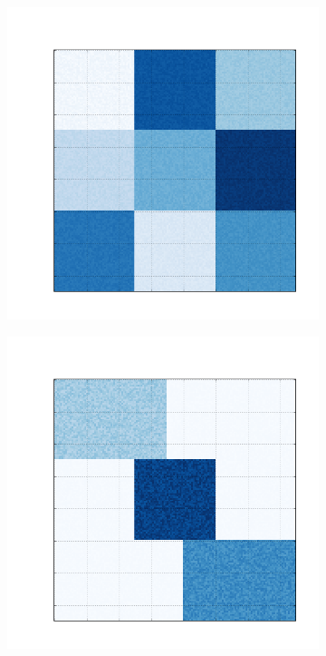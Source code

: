 \documentclass[
    12pt,                %
    oneside,            %
    a4paper,            %
    english,            %
    brazil                %
    ]{abntex2ppgsi}
\begin{document}
\begin{figure}[H]
\begin{subfigure}[b]{0.18\textwidth}
    \end{subfigure}
    \begin{subfigure}[b]{0.18\textwidth}
        \includegraphics[width=\textwidth]{img/c-bic-structure.png}
    \end{subfigure}
    \begin{subfigure}[b]{0.18\textwidth}
        \includegraphics[width=\textwidth]{img/d-bic-structure.png}

\end{subfigure}
\end{figure}
\end{document}
